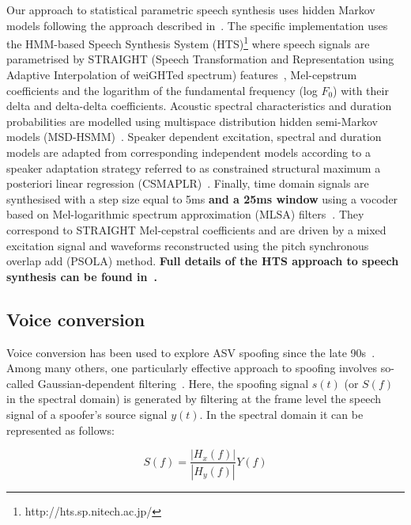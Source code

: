Our approach to statistical parametric speech synthesis uses hidden Markov models following the approach described in~\cite{Yamagishi2009a}.  The specific implementation uses the HMM-based Speech Synthesis System (HTS)\footnote{http://hts.sp.nitech.ac.jp/} where speech signals are parametrised by STRAIGHT (Speech Transformation and Representation using Adaptive Interpolation of weiGHTed spectrum) features~\cite{Kawahara2001}, Mel-cepstrum coefficients and the logarithm of the fundamental frequency (log $F_{0}$) with their delta and delta-delta coefficients.  Acoustic spectral characteristics and duration probabilities are modelled using multispace distribution hidden semi-Markov models (MSD-HSMM)~\cite{Russell1985}.  Speaker dependent  excitation, spectral and duration models are adapted from corresponding independent models according to a speaker adaptation strategy referred to as constrained structural maximum a posteriori linear regression (CSMAPLR)~\cite{Yamagishi2009a}.  Finally, time domain signals are synthesised with a step size equal to 5ms {\bfseries and a 25ms window} using a vocoder based on Mel-logarithmic spectrum approximation (MLSA) filters{\bfseries ~\cite{Imai1983}}.  They correspond to STRAIGHT Mel-cepstral coefficients and are driven by a mixed excitation signal and waveforms reconstructed using the pitch synchronous overlap add (PSOLA) method.  {\bfseries Full details of the HTS approach to speech synthesis can be found in~\cite{Yamagishi2009a,Yamagishi2009,Zen2007}.}





\subsection{Voice conversion}
\label{ssec:vconv}


Voice conversion has been used to explore ASV spoofing since the late 90s~\cite{Pellom1999}.  Among many others, one particularly effective approach to spoofing involves so-called Gaussian-dependent filtering~\cite{Matrouf2005}. Here, the spoofing signal $s(t)$ (or $S(f)$ in the spectral domain) is generated by filtering at the frame level the speech signal of a spoofer's source signal $y(t)$. In the spectral domain it can be represented as follows:

\begin{equation}
S(f) = \frac{\left|H_{x}(f)\right|}{\left|H_{y}(f)\right|}Y(f)
\label{eq:conversioneq}
\end{equation}


